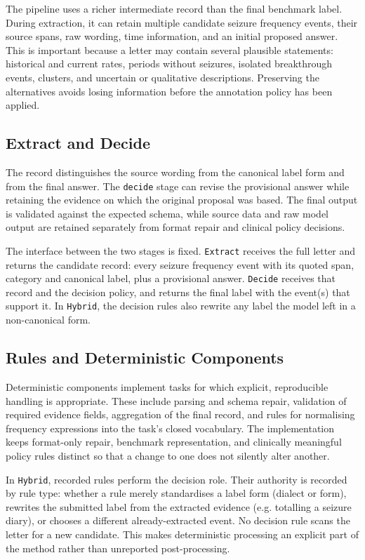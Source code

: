\documentclass[conference]{IEEEtran}
\begin{document}
The pipeline uses a richer intermediate record than the 
final benchmark label. During extraction, it can retain 
multiple candidate seizure frequency events, their source 
spans, raw wording, time information, and an initial 
proposed answer. This is important because a letter 
may contain several plausible statements: historical 
and current rates, periods without seizures, isolated 
breakthrough events, clusters, and uncertain or 
qualitative descriptions. Preserving the alternatives avoids 
losing information before the annotation policy has been 
applied.

\subsection{Extract and Decide}

The record distinguishes the source wording from the 
canonical label form and from the final answer. The 
\texttt{decide} stage can revise the provisional 
answer while retaining the evidence on which 
the original proposal was based. The final output is 
validated against the expected schema, while source 
data and raw model output are retained separately 
from format repair and clinical policy decisions.

The interface between the two stages is fixed. 
\texttt{Extract} receives the full letter and returns the 
candidate record: every seizure frequency event with its 
quoted span, category and canonical label, plus a 
provisional answer. \texttt{Decide} receives that record 
and the decision policy, and returns the 
final label with the event(s) that support it. In 
\texttt{Hybrid}, the decision rules also rewrite any 
label the model left in a non-canonical form.

\subsection{Rules and Deterministic Components}

Deterministic components implement tasks for which explicit, 
reproducible handling is appropriate. These include parsing 
and schema repair, validation of required evidence fields, 
aggregation of the final record, and rules for normalising 
frequency expressions into the task's closed vocabulary. The 
implementation keeps format-only repair, benchmark 
representation, and clinically meaningful policy rules distinct 
so that a change to one does not silently alter another.

In \texttt{Hybrid}, recorded rules perform the decision 
role. Their authority is recorded by rule type: whether a 
rule merely standardises a label form (dialect or 
form), rewrites the submitted label from the extracted 
evidence (e.g. totalling a seizure diary), or chooses a 
different already-extracted event. No decision 
rule scans the letter for a new candidate. This makes 
deterministic processing an explicit part of the method 
rather than unreported post-processing. 
\end{document}
